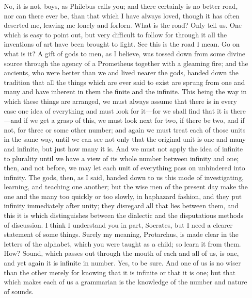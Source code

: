\documentclass[letterpaper,12pt]{article}
\newcommand{\stephpag}[1]{\marginnote{\small\itshape\fontfamily{ppl}\selectfont #1}}
\begin{document}
\begin{drama}
\socratesspeaks
No, it is not, boys, as Philebus calls you; and there certainly is no better road, nor can there ever be, than that which I have always loved, though it has often deserted me, leaving me lonely and forlorn.
\protarchusspeaks
What is the road? Only tell us. \stephpag{c}
\socratesspeaks
One which is easy to point out, but very difficult to follow for through it all the inventions of art have been brought to light. See this is the road I mean.
\protarchusspeaks
Go on what is it?
\socratesspeaks
A gift of gods to men, as I believe, was tossed down from some divine source through the agency of a Prometheus together with a gleaming fire; and the ancients, who were better than we and lived nearer the gods, handed down the tradition that all the things which are ever said to exist are sprung from one and many and have inherent in them the finite and the infinite. This being the way in which these things are arranged, \stephpag{d} we must always assume that there is in every case one idea of everything and must look for it---for we shall find that it is there---and if we get a grasp of this, we must look next for two, if there be two, and if not, for three or some other number; and again we must treat each of those units in the same way, until we can see not only that the original unit is one and many and infinite, but just how many it is. And we must not apply the idea of infinite to plurality until we have a view of its whole number \stephpag{e} between infinity and one; then, and not before, we may let each unit of everything pass on unhindered into infinity. The gods, then, as I said, handed down to us this mode of investigating, learning, and teaching one another; but the wise men of the present day make the one \stephpag{17 a} and the many too quickly or too slowly, in haphazard fashion, and they put infinity immediately after unity; they disregard all that lies between them, and this it is which distinguishes between the dialectic and the disputatious methods of discussion.
\protarchusspeaks
I think I understand you in part, Socrates, but I need a clearer statement of some things.
\socratesspeaks
Surely my meaning, Protarchus, is made clear in the letters of the alphabet, which you were taught as a child; \stephpag{b} so learn it from them.
\protarchusspeaks
How?
\socratesspeaks
Sound, which passes out through the mouth of each and all of us, is one, and yet again it is infinite in number.
\protarchusspeaks
Yes, to be sure.
\socratesspeaks
And one of us is no wiser than the other merely for knowing that it is infinite or that it is one; but that which makes each of us a grammarian is the knowledge of the number and nature of sounds.

\end{drama}
\end{document}
